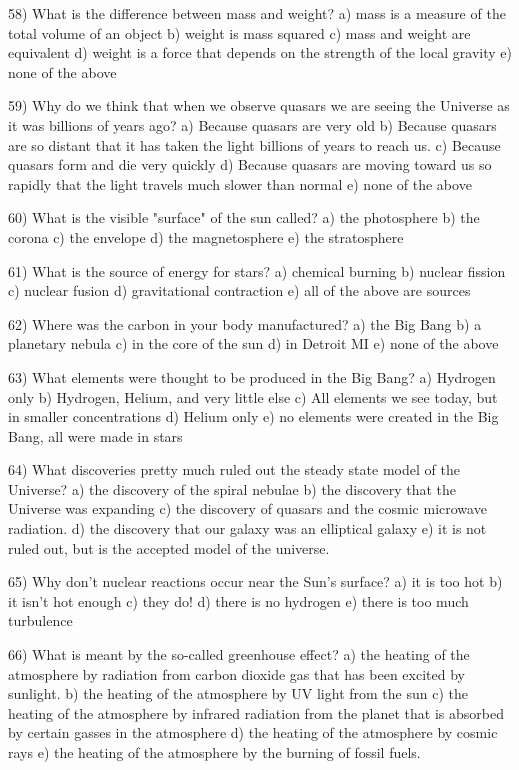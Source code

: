 58) What is the difference between mass and weight?
a) mass is a measure of the total volume of an object
b) weight is mass squared
c) mass and weight are equivalent
d) weight is a force that depends on the strength of the local gravity
e) none of the above

59) Why do we think that when we observe quasars we are seeing the Universe
as it was billions of years ago?
a) Because quasars are very old
b) Because quasars are so distant that it has taken the light billions
of years to reach us.
c) Because quasars form and die very quickly
d) Because quasars are moving toward us so rapidly that the light travels
much slower than normal
e) none of the above

60) What is the visible "surface" of the sun called?
a) the photosphere b) the corona c) the envelope d) the magnetosphere
e) the stratosphere

61) What is the source of energy for stars?
a) chemical burning b) nuclear fission c) nuclear fusion
d) gravitational contraction e) all of the above are sources

62) Where was the carbon in your body manufactured?
a) the Big Bang b) a planetary nebula c) in the core of the sun
d) in Detroit MI e) none of the above

63) What elements were thought to be produced in the Big Bang?
a) Hydrogen only
b) Hydrogen, Helium, and very little else
c) All elements we see today, but in smaller concentrations
d) Helium only
e) no elements were created in the Big Bang, all were made in stars

64) What discoveries pretty much ruled out the steady state model of the
Universe?
a) the discovery of the spiral nebulae
b) the discovery that the Universe was expanding
c) the discovery of quasars and the cosmic microwave radiation.
d) the discovery that our galaxy was an elliptical galaxy
e) it is not ruled out, but is the accepted model of the universe.

65) Why don't nuclear reactions occur near the Sun's surface?
a) it is too hot b) it isn't hot enough c) they do!
d) there is no hydrogen e) there is too much turbulence

66) What is meant by the so-called greenhouse effect?
a) the heating of the atmosphere by radiation from carbon dioxide
gas that has been excited by sunlight.
b) the heating of the atmosphere by UV light from the sun
c) the heating of the atmosphere by infrared radiation from the
planet that is absorbed by certain gasses in the atmosphere
d) the heating of the atmosphere by cosmic rays
e) the heating of the atmosphere by the burning of fossil fuels.

